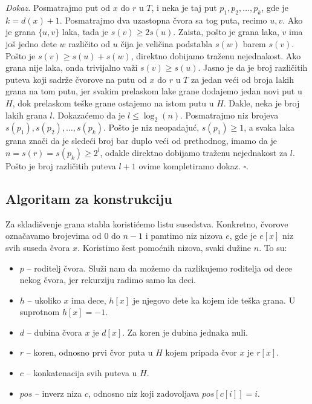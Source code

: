 \textit{Dokaz.} Posmatrajmo put od $x$ do $r$ u $T$, i neka je taj put $p_1, p_2, \ldots, p_k$, gde je $k = d(x)+1$. Posmatrajmo dva uzastopna \v cvora sa tog puta, recimo $u,v$. Ako je grana $\{u,v\}$ laka, tada je $s(v) \geq 2s(u)$. Zaista, po\v sto je grana laka, $v$ ima jo\v s jedno dete $w$ razli\v cito od $u$ \v cija je veli\v cina podstabla $s(w)$ barem $s(v)$. Po\v sto je $s(v) \geq s(u) + s(w)$, direktno dobijamo tra\v zenu nejednakost. Ako grana nije laka, onda trivijalno va\v zi $s(v) \geq s(u)$. Jasno je da je broj razli\v citih puteva koji sadr\v ze \v cvorove na putu od $x$ do $r$ u $T$ za jedan ve\' ci od broja lakih grana na tom putu, jer svakim prelaskom lake grane dodajemo jedan novi put u $H$, dok prelaskom te\v ske grane ostajemo na istom putu u $H$. Dakle, neka je broj lakih grana $l$. Dokaza\' cemo da je $l \leq \log_2(n)$. Posmatrajmo niz brojeva $s(p_1), s(p_2), \ldots, s(p_k)$. Po\v sto je niz neopadaju\' c, $s(p_1) \geq 1$, a svaka laka grana zna\v ci da je slede\' ci broj bar duplo ve\' ci od prethodnog, imamo da je $n = s(r) = s(p_k) \geq 2^l$, odakle direktno dobijamo tra\v zenu nejednakost za $l$. Po\v sto je broj razli\v citih puteva $l+1$ ovime kompletiramo dokaz. \hfill $\square$.

\subsection{Algoritam za konstrukciju}

Za skladi\v svenje grana stabla koristi\' cemo listu susedstva. Konkretno, \v cvorove ozna\v cavamo brojevima od $0$ do $n-1$ i pamtimo niz nizova $e$, gde je $e[x]$ niz svih suseda \v cvora $x$. 
Koristimo \v sest pomo\' cnih nizova, svaki du\v zine $n$. To su:

\begin{itemize}
\item $p$ -- roditelj \v cvora. Slu\v zi nam da mo\v zemo da razlikujemo roditelja od dece nekog \v cvora, jer rekurziju radimo samo ka deci.
\item $h$ -- ukoliko $x$ ima dece, $h[x]$ je njegovo dete ka kojem ide te\v ska grana. U suprotnom $h[x] = -1$.
\item $d$ -- dubina \v cvora $x$ je $d[x]$. Za koren je dubina jednaka nuli.
\item $r$ -- koren, odnosno prvi \v cvor puta u $H$ kojem pripada \v cvor $x$ je $r[x]$.
\item $c$ -- konkatenacija svih puteva u $H$.
\item $pos$ -- inverz niza $c$, odnosno niz koji zadovoljava $pos[c[i]] = i$.
\end{itemize}

